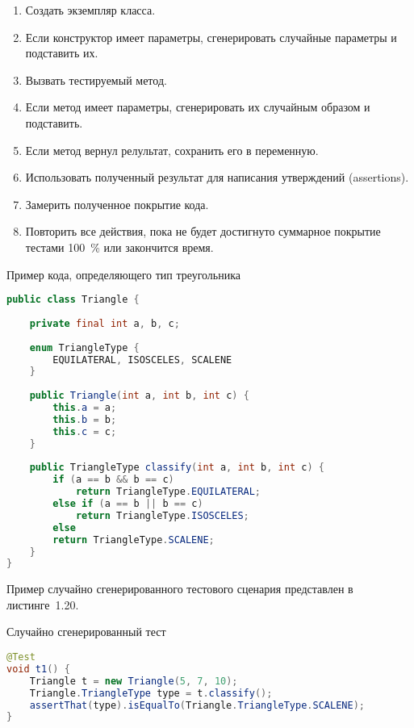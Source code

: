  \begin{enumerate}
 	\item Создать экземпляр класса.
 	\item Если конструктор имеет параметры, сгенерировать случайные параметры и подставить их.
 	\item Вызвать тестируемый метод.
 	\item Если метод имеет параметры, сгенерировать их случайным образом и подставить.
 	\item Если метод вернул релультат, сохранить его в переменную.
 	\item Использовать полученный результат для написания утверждений (assertions).
 	\item Замерить полученное покрытие кода.
 	\item Повторить все действия, пока не будет достигнуто суммарное покрытие тестами 100~\% или закончится время.
 \end{enumerate}

\begin{ListingEnv}[!h]%
	\captiondelim{ } %
	\caption{Пример кода, определяющего тип треугольника}
	\begin{lstlisting}[language={Java}]
public class Triangle {
	
	private final int a, b, c;
	
	enum TriangleType {
		EQUILATERAL, ISOSCELES, SCALENE
	}
	
	public Triangle(int a, int b, int c) {
		this.a = a;
		this.b = b;
		this.c = c;
	}
	
	public TriangleType classify(int a, int b, int c) {
		if (a == b && b == c)
			return TriangleType.EQUILATERAL;
		else if (a == b || b == c)
			return TriangleType.ISOSCELES;
		else
		return TriangleType.SCALENE;
	}
}
	\end{lstlisting}
\end{ListingEnv}%


Пример случайно сгенерированного тестового сценария представлен в листинге~1.20.

\begin{ListingEnv}[!h]%
	\captiondelim{ } %
	\caption{Случайно сгенерированный тест}
	\begin{lstlisting}[language={Java}]
@Test
void t1() {
	Triangle t = new Triangle(5, 7, 10);
	Triangle.TriangleType type = t.classify();
	assertThat(type).isEqualTo(Triangle.TriangleType.SCALENE);
}
	\end{lstlisting}
\end{ListingEnv}%

